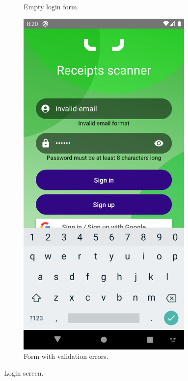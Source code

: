 \documentclass[
  digital, %
  table,   %
  oneside, %
  lof,     %
  lot,     %
]{fithesis3}
\newcommand\half{0.45}
\newcommand\subfigsize{0.95}
\begin{document}
\begin{figure}
\begin{subfigure}[t]{\half\textwidth}
  \caption{Empty login form.}
  \label{fig:login_screen}
\end{subfigure}
\begin{subfigure}[t]{\half\textwidth}
  \centering
  \includegraphics[width=\subfigsize\textwidth]{figures/screens/android/light/login_validation}
  \caption{Form with validation \mbox{errors}.}
  \label{fig:login_validation}
\end{subfigure}
\caption{Login screen.}
\end{figure}
\end{document}
